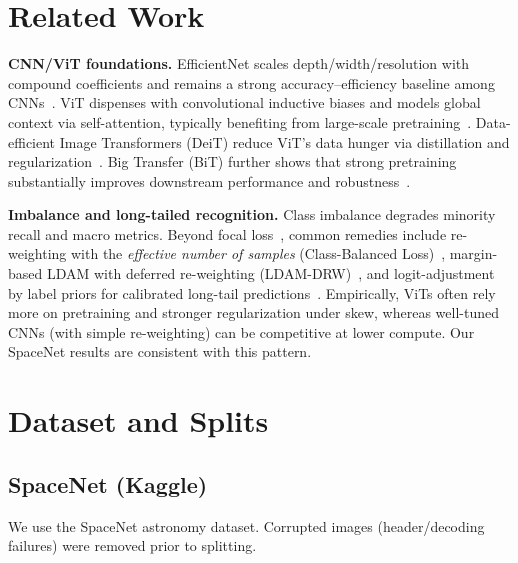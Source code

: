 \section{Related Work}
\textbf{CNN/ViT foundations.} EfficientNet scales depth/width/resolution with compound coefficients and remains a strong accuracy–efficiency baseline among CNNs~\cite{EfficientNet_TanLe}. ViT dispenses with convolutional inductive biases and models global context via self-attention, typically benefiting from large-scale pretraining~\cite{Dosovitskiy2020ViT}. Data-efficient Image Transformers (DeiT) reduce ViT’s data hunger via distillation and regularization~\cite{DeiT_Touvron}. Big Transfer (BiT) further shows that strong pretraining substantially improves downstream performance and robustness~\cite{BiT_Kolesnikov}.

\textbf{Imbalance and long-tailed recognition.} Class imbalance degrades minority recall and macro metrics. Beyond focal loss~\cite{Lin2017FocalLoss}, common remedies include re-weighting with the \emph{effective number of samples} (Class-Balanced Loss)~\cite{Cui2019ClassBalanced}, margin-based LDAM with deferred re-weighting (LDAM-DRW)~\cite{Cao2019LDAM}, and logit-adjustment by label priors for calibrated long-tail predictions~\cite{Menon2021LogitAdjust}. Empirically, ViTs often rely more on pretraining and stronger regularization under skew, whereas well-tuned CNNs (with simple re-weighting) can be competitive at lower compute. Our SpaceNet results are consistent with this pattern.

\section{Dataset and Splits}
\subsection{SpaceNet (Kaggle)} We use the SpaceNet astronomy dataset\cite{SpaceNetKaggle}. Corrupted images (header/decoding failures) were removed prior to splitting.

